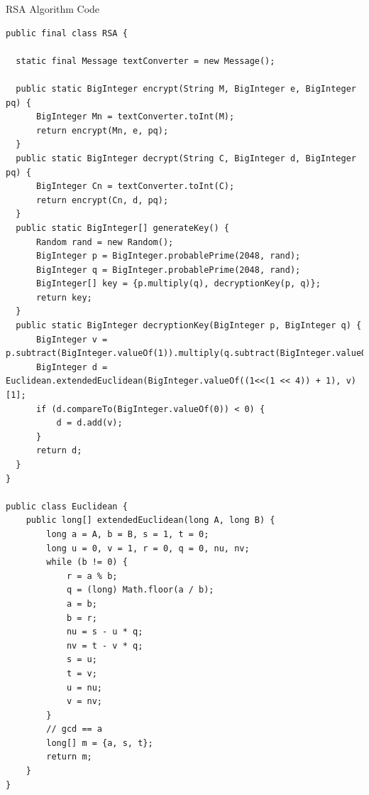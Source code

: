 \documentclass[landscape,a0paper,fontscale=.46]{baposter} %
\begin{document}
\begin{poster}
\begin{posterbox}[name=code,column=3,span=2,row=0]{RSA Algorithm Code}
\begin{verbatim}
public final class RSA {

  static final Message textConverter = new Message();

  public static BigInteger encrypt(String M, BigInteger e, BigInteger pq) {
      BigInteger Mn = textConverter.toInt(M);
      return encrypt(Mn, e, pq);
  }
  public static BigInteger decrypt(String C, BigInteger d, BigInteger pq) {
      BigInteger Cn = textConverter.toInt(C);
      return encrypt(Cn, d, pq);
  }
  public static BigInteger[] generateKey() {
      Random rand = new Random();
      BigInteger p = BigInteger.probablePrime(2048, rand);
      BigInteger q = BigInteger.probablePrime(2048, rand);
      BigInteger[] key = {p.multiply(q), decryptionKey(p, q)};
      return key;
  }
  public static BigInteger decryptionKey(BigInteger p, BigInteger q) {
      BigInteger v = p.subtract(BigInteger.valueOf(1)).multiply(q.subtract(BigInteger.valueOf(1)));
      BigInteger d = Euclidean.extendedEuclidean(BigInteger.valueOf((1<<(1 << 4)) + 1), v)[1];
      if (d.compareTo(BigInteger.valueOf(0)) < 0) {
          d = d.add(v);
      }
      return d;
  }
}

public class Euclidean {
    public long[] extendedEuclidean(long A, long B) {
        long a = A, b = B, s = 1, t = 0;
        long u = 0, v = 1, r = 0, q = 0, nu, nv;
        while (b != 0) {
            r = a % b;
            q = (long) Math.floor(a / b);
            a = b;
            b = r;
            nu = s - u * q;
            nv = t - v * q;
            s = u;
            t = v;
            u = nu;
            v = nv;
        }
        // gcd == a
        long[] m = {a, s, t};
        return m;
    }
}
\end{verbatim}

\end{posterbox}








\end{poster}
\end{document}

